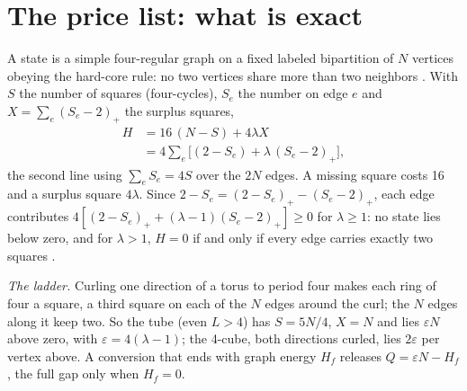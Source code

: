 \documentclass[aps,pre,10pt,twocolumn,superscriptaddress,nofootinbib]{revtex4-2}
\begin{document}
\section{The price list: what is exact}
\label{sec:exact}

A state is a simple four-regular graph on a fixed labeled bipartition of $N$ vertices obeying the hard-core rule:
no two vertices share more than two neighbors \cite{KTB19,T25}. With $S$ the number of squares (four-cycles),
$S_e$ the number on edge $e$ and $X=\sum_e(S_e-2)_+$ the surplus squares,
\begin{equation}
\begin{aligned}
H &= 16\,(N - S) + 4\lambda X\\
  &= 4 \sum_e \bigl[(2 - S_e) + \lambda\,(S_e - 2)_+\bigr],
\end{aligned}
\label{eq:H}
\end{equation}
the second line using $\sum_e S_e=4S$ over the $2N$ edges. A missing square costs 16 and a surplus square
$4\lambda$. Since $2-S_e=(2-S_e)_+-(S_e-2)_+$, each edge contributes
$4[(2-S_e)_++(\lambda-1)(S_e-2)_+]\ge0$ for $\lambda\ge1$: no state lies below zero, and for
$\lambda>1$, $H=0$ if and only if every edge carries exactly two squares \cite{paper1}.

\emph{The ladder.} Curling one direction of a torus to period four makes each ring of four a square, a third
square on each of the $N$ edges around the curl; the $N$ edges along it keep two. So the tube (even $L>4$) has
$S=5N/4$, $X=N$ and lies $\varepsilon N$ above zero, with
$\varepsilon=4(\lambda-1)$; the 4-cube, both directions curled, lies $2\varepsilon$ per vertex above. A
conversion that ends with graph energy $H_f$ releases $Q=\varepsilon N-H_f$, the full gap only when $H_f=0$.
\end{document}

